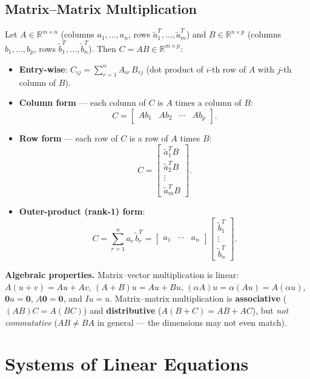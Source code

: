 \documentclass[hidelinks]{article}
\begin{document}
\subsection{Matrix--Matrix Multiplication}
Let $A \in \mathbb{R}^{m\times n}$ (columns $a_1,\ldots,a_n$, rows $\tilde{a}_1^T,\ldots,\tilde{a}_m^T$)
and $B \in \mathbb{R}^{n\times p}$ (columns $b_1,\ldots,b_p$, rows $\tilde{b}_1^T,\ldots,\tilde{b}_n^T$).
Then $C = AB \in \mathbb{R}^{m\times p}$:
\begin{itemize}
    \item \textbf{Entry-wise}: $C_{ij} = \displaystyle\sum_{r=1}^{n} A_{ir}\, B_{rj}$ \quad (dot product of $i$-th row of $A$ with $j$-th column of $B$).
    \item \textbf{Column form} — each column of $C$ is $A$ times a column of $B$:
    \[
        C = \begin{bmatrix} Ab_1 & Ab_2 & \cdots & Ab_p \end{bmatrix}.
    \]
    \item \textbf{Row form} — each row of $C$ is a row of $A$ times $B$:
    \[
        C = \begin{bmatrix} \tilde{a}_1^T B \\ \tilde{a}_2^T B \\ \vdots \\ \tilde{a}_m^T B \end{bmatrix}.
    \]
    \item \textbf{Outer-product (rank-1) form}:
    \[
        C = \sum_{r=1}^{n} a_r\, \tilde{b}_r^T
          = \begin{bmatrix} a_1 & \cdots & a_n \end{bmatrix}
            \begin{bmatrix} \tilde{b}_1^T \\ \vdots \\ \tilde{b}_n^T \end{bmatrix}.
    \]
\end{itemize}

\textbf{Algebraic properties.} Matrix--vector multiplication is linear: $A(u+v)=Au+Av$, $(A+B)u=Au+Bu$, $(\alpha A)u = \alpha(Au) = A(\alpha u)$, $\mathbf 0 u = \mathbf 0$, $A\mathbf 0 = \mathbf 0$, and $Iu = u$. Matrix--matrix multiplication is \textbf{associative} ($(AB)C = A(BC)$) and \textbf{distributive} ($A(B+C) = AB+AC$), but \emph{not commutative} ($AB \neq BA$ in general — the dimensions may not even match).

\section{Systems of Linear Equations}
\end{document}
